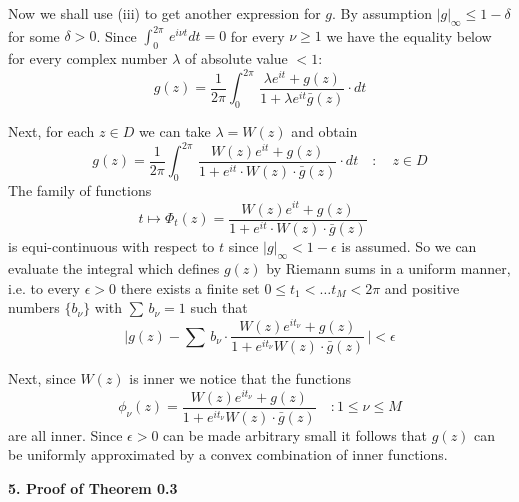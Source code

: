 \documentclass{amsart}
\def\uuu{_}
\begin{document}
\noindent
Now we shall use (iii) to get
another expression for $g$.
By assumption
$|g|_\infty\leq 1-\delta$  for some
$\delta>0$.
Since $\int_0^{2\pi}\, e^{i\nu t}dt=0$
for every $\nu\geq 1$ we have the  equality below for every
complex number $\lambda$ of absolute value $< 1$:
\[
g(z)= \frac{1}{2\pi}\int_0^{2\pi}\,
\frac{\lambda e^{it}+g(z)}{1+\lambda e^{it}\bar g(z)}\cdot dt\tag{iv}
\]


\noindent
Next, for each $z\in D$ we can take
$\lambda=W(z)$ and obtain
\[
g(z)= \frac{1}{2\pi}\int_0^{2\pi}\,
\frac{W(z) e^{it}+g(z)}{1+e^{it}\cdot W(z)\cdot \bar g(z)}\cdot dt
\quad\colon\quad z\in D
\]
The family of functions
\[
t\mapsto \Phi\uuu t(z)=
\frac{W(z) e^{it}+g(z)}{1+e^{it}\cdot W(z)\cdot \bar g(z)}\quad
\]
is equi-continuous with respect to $t$ since
$|g|_\infty<1-\epsilon$ is assumed.
So we can evaluate the  integral which defines $g(z)$
by Riemann sums in a uniform
manner, i.e. to every $\epsilon>0$
there exists a finite set
$0\leq t_1<\ldots t_M<2\pi$
and positive numbers
$\{b_\nu\}$ with $\sum\, b_\nu=1$ such that
\[
\bigl |g(z)-\sum\, b_\nu\cdot 
\frac{W(z)e^{it_\nu}+g(z)}{1+e^{it_\nu}W(z)\cdot \bar g(z)}\,\bigr|\tag{v}
<\epsilon
\]


\noindent
Next, since $W(z)$ is inner we notice that the functions
\[
\phi_\nu(z)= 
\frac{W(z)e^{it_\nu}+g(z)}{1+e^{it_\nu}W(z)\cdot \bar g(z)}
\quad\colon1\leq\nu\leq M
\]
are all inner.
Since $\epsilon>0$ can be made arbitrary small it follows  that
$g(z)$ can be uniformly approximated by a convex combination of
inner functions.



\newpage

\centerline{\bf 5. Proof of Theorem 0.3}
\bigskip
\end{document}
